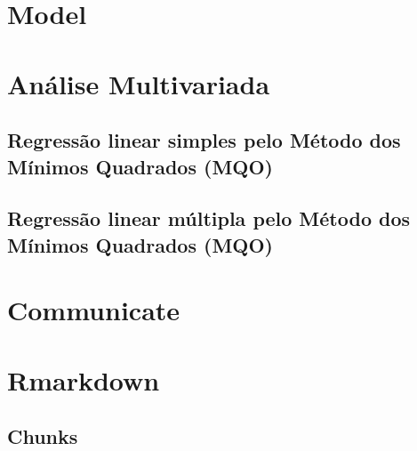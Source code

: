 \documentclass[a4paper,12pt]{article}
\begin{document}
\section{Model}
\section*{Análise Multivariada}
\subsection*{Regressão linear simples pelo Método dos Mínimos Quadrados (MQO)}
\subsection*{Regressão linear múltipla pelo Método dos Mínimos Quadrados (MQO)}

\section{Communicate}
\section*{Rmarkdown}
\subsection*{Chunks}
\end{document}
